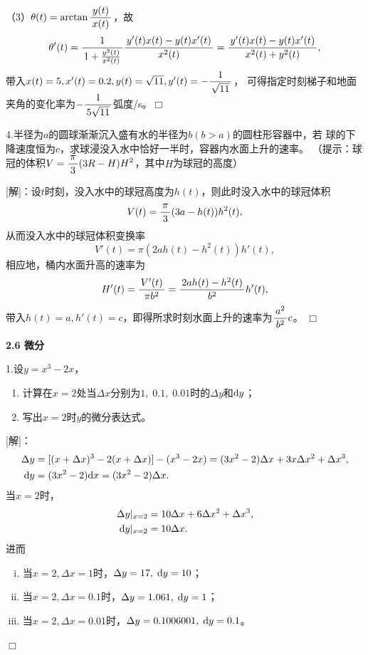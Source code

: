 （3）$\theta(t)=\arctan\displaystyle\frac{\,{y(t)}\,}{\,{x(t)}\,}$，故
$$\theta'(t)=\displaystyle\frac{\,{1}\,}{\,{1+\frac{y^2(t)}{x^2(t)}}\,}
\displaystyle\frac{\,{y'(t)x(t)-y(t)x'(t)}\,}{\,{x^2(t)}\,}=\displaystyle\frac{\,{y'(t)x(t)-y(t)x'(t)}\,}{\,{x^2(t)+y^2(t)}\,},$$
带入$x(t)=5,x'(t)=0.2,y(t)=\sqrt{11},y'(t)=-\displaystyle\frac{\,{1}\,}{\,{\sqrt{11}}\,}$，
可得指定时刻梯子和地面夹角的变化率为$-\displaystyle\frac{\,{1}\,}{\,{5\sqrt{11}}\,}$弧度/s。\hfill$\Box$

\bigskip

4.半径为$a$的圆球渐渐沉入盛有水的半径为$b(b>a)$的圆柱形容器中，若
球的下降速度恒为$c$，求球浸没入水中恰好一半时，容器内水面上升的速率。
（提示：球冠的体积$V=\displaystyle\frac{\,{\pi}\,}{\,{3}\,}(3R-H)H^2$，其中$H$为球冠的高度）

[解]：设$t$时刻，没入水中的球冠高度为$h(t)$，则此时没入水中的球冠体积
$$V(t)=\displaystyle\frac{\,{\pi}\,}{\,{3}\,}(3a-h(t))h^2(t),$$
从而没入水中的球冠体积变换率
$$V'(t)=\pi(2ah(t)-h^2(t))h'(t),$$
相应地，桶内水面升高的速率为
$$H'(t)=\displaystyle\frac{\,{V'(t)}\,}{\,{\pi b^2}\,}=\displaystyle\frac{\,{2ah(t)-h^2(t)}\,}{\,{b^2}\,}h'(t),$$
带入$h(t)=a,h'(t)=c$，即得所求时刻水面上升的速率为$\displaystyle\frac{\,{a^2}\,}{\,{b^2}\,}c$。
\hfill$\Box$

\begin{center}
	\bf 2.6 微分
\end{center}

\bigskip

1.设$y=x^3-2x$，
\begin{enumerate}[(1)]
  \setlength{\itemindent}{1cm}
  \item 计算在$x=2$处当$\Delta x$分别为$1,\;0.1,\;
  0.01$时的$\Delta y$和$\mathrm{d} y$；
  \item 写出$x=2$时$y$的微分表达式。
\end{enumerate}

[解]：
\begin{align*}
	\Delta y&=[(x+\Delta x)^3-2(x+\Delta x)]-(x^3-2x)
	=(3x^2-2)\Delta x+3x\Delta x^2+\Delta x^3,\\
	\mathrm{d} y&=(3x^2-2)\mathrm{d} x=(3x^2-2)\Delta x.
\end{align*}
当$x=2$时，
\begin{align*}
	\Delta y|_{x=2}&
	=10\Delta x+6\Delta x^2+\Delta x^3,\\
	\mathrm{d} y|_{x=2}&=10\Delta x.
\end{align*}
进而
\begin{enumerate}[(i)]
  \item 当$x=2,\Delta x=1$时，$\Delta y=17,\;\mathrm{d} y=10$；
  \item 当$x=2,\Delta x=0.1$时，$\Delta y=1.061,\;\mathrm{d} y=1$；
  \item 当$x=2,\Delta x=0.01$时，$\Delta y=0.1006001,\;\mathrm{d} y=0.1$。
\end{enumerate}
\hfill$\Box$

